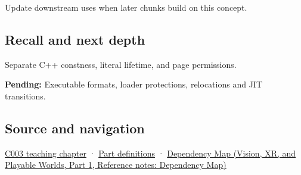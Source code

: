 \hypertarget{appendix-5f9e5e2f0a5e-used-by}{}

Update downstream uses when later chunks build on this concept.

\subsection{Recall and next depth}\label{appendix-5f9e5e2f0a5e-recall-and-next-depth}

\hypertarget{appendix-5f9e5e2f0a5e-recall-and-next-depth}{}

Separate C++ constness, literal lifetime, and page permissions.

\textbf{Pending:} Executable formats, loader protections, relocations and JIT transitions.

\subsection{Source and navigation}\label{appendix-5f9e5e2f0a5e-source-and-navigation}

\hypertarget{appendix-5f9e5e2f0a5e-source-and-navigation}{}

\hyperref[01-foundations-i-ch002-where-the-bytes-live]{C003 teaching chapter} · \hyperref[appendix-fd090d982a15-m003---parts-41-60]{Part definitions} · \href{../07-Vision-XR-and-Playable-Worlds-P01/main.pdf\#appendix-4ad47bdd269a}{Dependency Map (Vision, XR, and Playable Worlds, Part 1, Reference notes: Dependency Map)}
